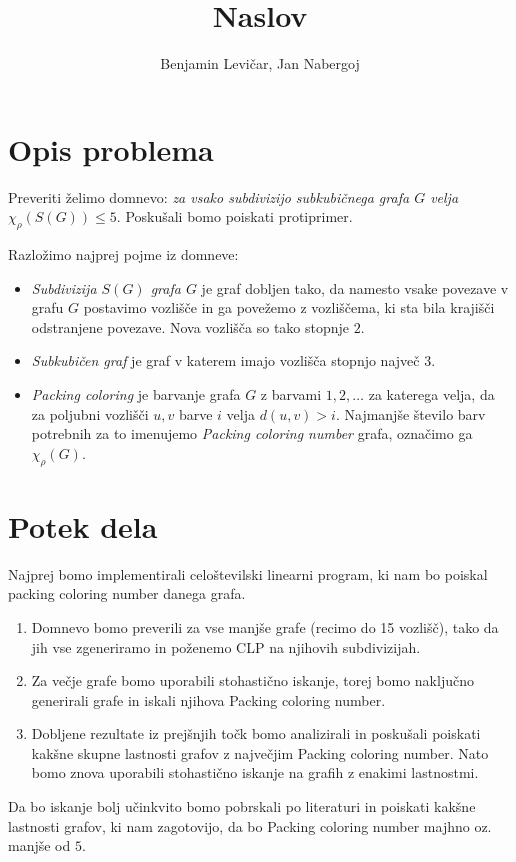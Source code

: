\documentclass[11pt,a4paper]{article}
\begin{document}
\title{Naslov}
\author{Benjamin Levičar, Jan Nabergoj}

\maketitle

\section{Opis problema}

Preveriti  želimo domnevo: \emph{za vsako subdivizijo subkubičnega grafa $G$ velja $\chi_\rho(S(G)) \leq 5$}. Poskušali bomo poiskati protiprimer.

Razložimo najprej pojme iz domneve:
\begin{itemize}
    \item \emph{Subdivizija $S(G)$ grafa $G$} je graf dobljen tako, da namesto vsake povezave v grafu $G$ postavimo vozlišče in ga povežemo z vozliščema,
          ki sta bila krajišči odstranjene povezave. Nova vozlišča so tako stopnje $2$.
    \item \emph{Subkubičen graf} je graf v katerem imajo vozlišča stopnjo največ $3$.
    \item \emph{Packing coloring} je barvanje grafa $G$ z barvami $1, 2, \dots$ za katerega velja, da za poljubni vozlišči $u, v$ barve $i$ velja $d(u, v) > i$.
          Najmanjše število barv potrebnih za to imenujemo \emph{Packing coloring number} grafa, označimo ga $\chi_\rho(G)$.
\end{itemize}


\section{Potek dela}

Najprej bomo implementirali celoštevilski linearni program, ki nam bo poiskal packing coloring number danega grafa. 

\begin{enumerate}
    \item Domnevo bomo preverili za vse manjše grafe (recimo do 15 vozlišč), tako da jih vse zgeneriramo in poženemo CLP na njihovih subdivizijah.
    \item Za večje grafe bomo uporabili stohastično iskanje, torej bomo naključno generirali grafe in iskali njihova Packing coloring number.
    \item Dobljene rezultate iz prejšnjih točk bomo analizirali in poskušali poiskati kakšne skupne lastnosti grafov z največjim Packing coloring
          number. Nato bomo znova uporabili stohastično iskanje na grafih z enakimi lastnostmi.
\end{enumerate}

Da bo iskanje bolj učinkvito bomo pobrskali po literaturi in poiskati kakšne lastnosti grafov, ki nam zagotovijo, da bo Packing coloring number majhno
oz. manjše od $5$.
\end{document}
